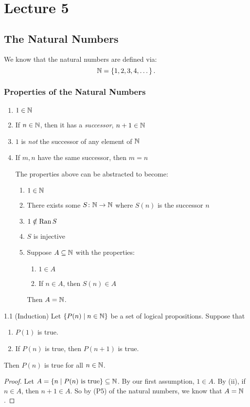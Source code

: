 \documentclass[class=article, crop=false]{standalone}
\begin{document}
  \section{Lecture 5}
  \subsection{The Natural Numbers}
  We know that the natural numbers are defined via:
  \[
    \mathbb{N} = \left\{1, 2, 3, 4, \dotsc\right\}.
  \]
  \subsubsection{Properties of the Natural Numbers}
  \begin{enumerate}[label=(P\arabic*)]
    \item $1\in\mathbb{N}$
    \item If $n\in \mathbb{N}$, then it has a \emph{successor}, $n + 1\in\mathbb{N}$
    \item $1$ is \emph{not} the successor of any element of $\mathbb{N}$
    \item If $m, n$ have the same successor, then $m = n$
    \begin{note}{}
      The properties above can be abstracted to become:
      \begin{enumerate}[label=(P\arabic*)]
        \item $1\in \mathbb{N}$
        \item There exists some $S\colon \mathbb{N}\to \mathbb{N}$ where $S(n)$ is the successor $n$
        \item $1\notin \operatorname{Ran} S$
        \item $S$ is injective
        \item Suppose $A\subseteq \mathbb{N}$ with the properties:
        \begin{enumerate}[label=(\roman*)]
          \item $1\in A$
          \item If $n\in A$, then $S(n)\in A$
        \end{enumerate}
        Then $A = \mathbb{N}$.
      \end{enumerate}
    \end{note}
  \end{enumerate}
  \begin{theorem}{1.1 (Induction)}
    Let $\left\{P(n)\mid n\in\mathbb{N}\right\}$ be a set of logical propositions. Suppose that
    \begin{enumerate}[label=(\roman*)]
      \item $P(1)$ is true.
      \item If $P(n)$ is true, then $P(n + 1)$ is true.
    \end{enumerate}
    Then $P(n)$ is true for all $n\in\mathbb{N}$.
    \begin{proof}
      Let $A = \left\{n\mid P(n) \text{ is true}\right\}\subseteq\mathbb{N}$. By our first assumption, $1\in A$. By (ii), if $n\in A$, then $n + 1\in A$. So by (P5) of the natural numbers, we know that $A = \mathbb{N}$.
    \end{proof}
  \end{theorem}
\end{document}
